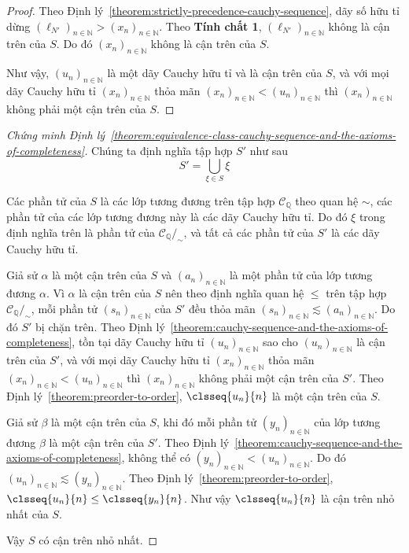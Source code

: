 \begin{proof}
    Theo Định lý~\ref{theorem:strictly-precedence-cauchy-sequence}, dãy số hữu tỉ dừng ${(\ell_{N'})}_{n\in\mathbb{N}} > {(x_{n})}_{n\in\mathbb{N}}$. Theo \textbf{Tính chất 1}, ${(\ell_{N'})}_{n\in\mathbb{N}}$ không là cận trên của $S$. Do đó ${(x_{n})}_{n\in\mathbb{N}}$ không là cận trên của $S$.

    Như vậy, ${(u_{n})}_{n\in\mathbb{N}}$ là một dãy Cauchy hữu tỉ và là cận trên của $S$, và với mọi dãy Cauchy hữu tỉ ${(x_{n})}_{n\in\mathbb{N}}$ thỏa mãn ${(x_{n})}_{n\in\mathbb{N}} < {(u_{n})}_{n\in\mathbb{N}}$ thì ${(x_{n})}_{n\in\mathbb{N}}$ không phải một cận trên của $S$.
\end{proof}

\begin{proof}[Chứng minh Định lý~\ref{theorem:equivalence-class-cauchy-sequence-and-the-axioms-of-completeness}]
    Chúng ta định nghĩa tập hợp $S'$ như sau
    \[
        S' = \bigcup_{\xi\in S} \xi
    \]

    Các phần tử của $S$ là các lớp tương đương trên tập hợp $\mathscr{C}_{\mathbb{Q}}$ theo quan hệ $\sim$, các phần tử của các lớp tương đương này là các dãy Cauchy hữu tỉ. Do đó $\xi$ trong định nghĩa trên là phần tử của $\mathscr{C}_{\mathbb{Q}}/_{\sim}$, và tất cả các phần tử của $S'$ là các dãy Cauchy hữu tỉ.

    Giả sử $\alpha$ là một cận trên của $S$ và ${(a_{n})}_{n\in\mathbb{N}}$ là một phần tử của lớp tương đương $\alpha$. Vì $\alpha$ là cận trên của $S$ nên theo định nghĩa quan hệ $\leq$ trên tập hợp $\mathscr{C}_{\mathbb{Q}}/_{\sim}$, mỗi phần tử ${(s_{n})}_{n\in\mathbb{N}}$ của $S'$ đều thỏa mãn ${(s_{n})}_{n\in\mathbb{N}}\lesssim {(a_{n})}_{n\in\mathbb{N}}$. Do đó $S'$ bị chặn trên. Theo Định lý~\ref{theorem:cauchy-sequence-and-the-axioms-of-completeness}, tồn tại dãy Cauchy hữu tỉ ${(u_{n})}_{n\in\mathbb{N}}$ sao cho ${(u_{n})}_{n\in\mathbb{N}}$ là cận trên của $S'$, và với mọi dãy Cauchy hữu tỉ ${(x_{n})}_{n\in\mathbb{N}}$ thỏa mãn ${(x_{n})}_{n\in\mathbb{N}} < {(u_{n})}_{n\in\mathbb{N}}$ thì ${(x_{n})}_{n\in\mathbb{N}}$ không phải một cận trên của $S'$. Theo Định lý~\ref{theorem:preorder-to-order}, $\clsseq{u_{n}}{n}$ là một cận trên của $S$.

    Giả sử $\beta$ là một cận trên của $S$, khi đó mỗi phần tử ${(y_{n})}_{n\in\mathbb{N}}$ của lớp tương đương $\beta$ là một cận trên của $S'$. Theo Định lý~\ref{theorem:cauchy-sequence-and-the-axioms-of-completeness}, không thể có ${(y_{n})}_{n\in\mathbb{N}} < {(u_{n})}_{n\in\mathbb{N}}$. Do đó ${(u_{n})}_{n\in\mathbb{N}}\lesssim {(y_{n})}_{n\in\mathbb{N}}$.  Theo Định lý~\ref{theorem:preorder-to-order}, $\clsseq{u_{n}}{n}\leq \clsseq{y_{n}}{n}$. Như vậy $\clsseq{u_{n}}{n}$ là cận trên nhỏ nhất của $S$.

    Vậy $S$ có cận trên nhỏ nhất.
\end{proof}

